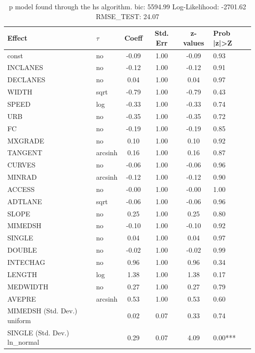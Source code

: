 \begin{table}
	\caption{p model found through the hs algorithm. bic: 5594.99 Log-Likelihood: -2701.62 RMSE_TEST: 24.07}
	\begin{center}
		\begin{tabular}{|l|l|c|c|c|l|}
			\hline
			Effect & $\tau$ & Coeff & Std. Err & z-values & Prob |z|>Z \\
			\hline
			const & no & -0.09 & 1.00 & -0.09 & 0.93 \\
			\hline
			INCLANES & no & -0.12 & 1.00 & -0.12 & 0.91 \\
			\hline
			DECLANES & no & 0.04 & 1.00 & 0.04 & 0.97 \\
			\hline
			WIDTH & sqrt & -0.79 & 1.00 & -0.79 & 0.43 \\
			\hline
			SPEED & log & -0.33 & 1.00 & -0.33 & 0.74 \\
			\hline
			URB & no & -0.35 & 1.00 & -0.35 & 0.72 \\
			\hline
			FC & no & -0.19 & 1.00 & -0.19 & 0.85 \\
			\hline
			MXGRADE & no & 0.10 & 1.00 & 0.10 & 0.92 \\
			\hline
			TANGENT & arcsinh & 0.16 & 1.00 & 0.16 & 0.87 \\
			\hline
			CURVES & no & -0.06 & 1.00 & -0.06 & 0.96 \\
			\hline
			MINRAD & arcsinh & -0.12 & 1.00 & -0.12 & 0.90 \\
			\hline
			ACCESS & no & -0.00 & 1.00 & -0.00 & 1.00 \\
			\hline
			ADTLANE & sqrt & -0.06 & 1.00 & -0.06 & 0.96 \\
			\hline
			SLOPE & no & 0.25 & 1.00 & 0.25 & 0.80 \\
			\hline
			MIMEDSH & no & -0.10 & 1.00 & -0.10 & 0.92 \\
			\hline
			SINGLE & no & 0.04 & 1.00 & 0.04 & 0.97 \\
			\hline
			DOUBLE & no & -0.02 & 1.00 & -0.02 & 0.99 \\
			\hline
			INTECHAG & no & 0.96 & 1.00 & 0.96 & 0.34 \\
			\hline
			LENGTH & log & 1.38 & 1.00 & 1.38 & 0.17 \\
			\hline
			MEDWIDTH & no & 0.27 & 1.00 & 0.27 & 0.79 \\
			\hline
			AVEPRE & arcsinh & 0.53 & 1.00 & 0.53 & 0.60 \\
			\hline
			MIMEDSH (Std. Dev.) uniform &  & 0.02 & 0.07 & 0.33 & 0.74 \\
			\hline
			SINGLE (Std. Dev.) ln_normal &  & 0.29 & 0.07 & 4.09 & 0.00*** \\

\end{tabular}
\end{center}
\end{table}
